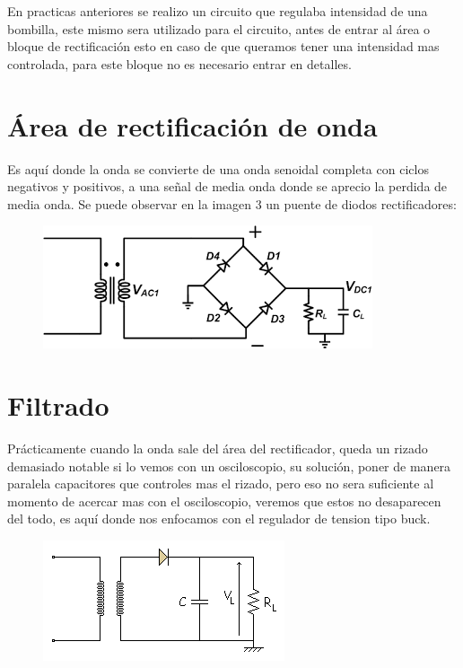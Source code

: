 \documentclass[12pt,a4paper]{article}
\begin{document}
En practicas anteriores se realizo un circuito que regulaba intensidad de una bombilla, este mismo sera utilizado para el circuito, antes de entrar al área o bloque de rectificación esto en caso de que queramos tener una intensidad mas controlada, para este bloque no es necesario entrar en detalles.

\section{Área de rectificación de onda}

Es aquí donde la onda se convierte de una onda senoidal completa con ciclos negativos y positivos, a una señal de media onda donde se aprecio la perdida de media onda. Se puede observar en la imagen 3 un puente de diodos rectificadores:

\begin{figure}[h]
\begin{center}
\includegraphics[scale=0.5]{imagenes/4.jpeg}
\end{center}
\end{figure}

\section{Filtrado}

Prácticamente cuando la onda sale del área del rectificador, queda un rizado demasiado notable si lo vemos con un osciloscopio, su solución, poner de manera paralela capacitores que controles mas el rizado, pero eso no sera suficiente al momento de acercar mas con el osciloscopio, veremos que estos no desaparecen del todo, es aquí donde nos enfocamos con el regulador de tension tipo buck.

\begin{figure}[h]
\begin{center}
\includegraphics[scale=0.5]{imagenes/5.png}
\end{center}
\end{figure}
\end{document}
